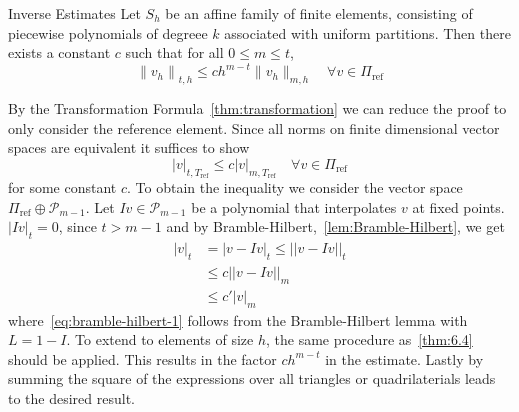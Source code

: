 \begin{thmx}{Inverse Estimates\label{thm:inverse}}
    Let $S_h$ be an affine family of finite elements, consisting of piecewise polynomials of degreee $k$ associated with uniform partitions. 
    Then there exists a constant $c$ such that for all $0 \leq m \leq t$,
    \begin{equation}
        {\|v_h\|}_{t,h} \leq ch^{m-t}\|v_h\|_{m,h} \quad \forall v \in \Pi_{\text{ref}}
    \end{equation}
\end{thmx}

\begin{bev}
    By the Transformation Formula~\ref{thm:transformation} we can reduce the proof to only consider the reference element. 
    Since all norms on finite dimensional vector spaces are equivalent it suffices to show
    \begin{equation}
        |v|_{t,T_{\text{ref}}} \leq c |v|_{m, T_{\text{ref}}} \quad \forall v \in \Pi_{\text{ref}}
    \end{equation}
    for some constant $c$.
    To obtain the inequality we consider the vector space $\Pi_{\text{ref}}\oplus \mathcal{P}_{m-1}$. Let $Iv \in \mathcal{P}_{m-1}$ be a polynomial that interpolates $v$ at fixed points. $|Iv|_t = 0$, since $t > m-1$ 
    and by Bramble-Hilbert,~\ref{lem:Bramble-Hilbert}, we get
    \begin{align}
        |v|_t &= |v-Iv|_t \leq ||v-Iv||_t \nonumber\\
              &\leq c||v-Iv||_m \nonumber\\
              &\leq c'|v|_m\label{eq:bramble-hilbert-1}
    \end{align}
    where~\eqref{eq:bramble-hilbert-1} follows from the Bramble-Hilbert lemma with $L=1-I$. To extend to elements of size $h$, the same procedure as~\ref{thm:6.4} should be applied. This results in the factor $ch^{m-t}$ in the estimate. Lastly by summing the square of the expressions over all triangles or quadrilaterials leads to the desired result.
\end{bev}
